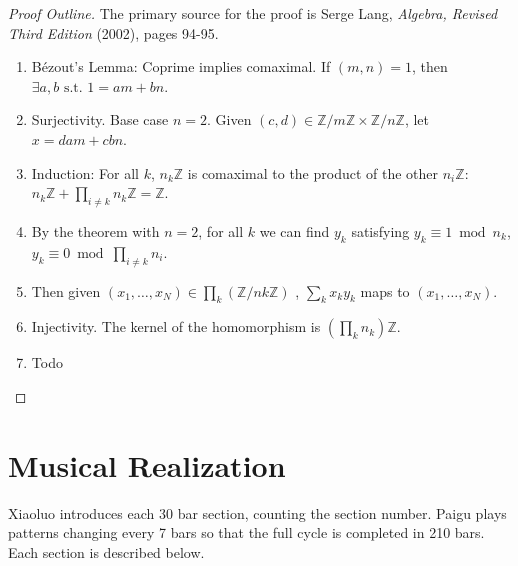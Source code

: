 \documentclass[12pt]{article}
\begin{document}
\begin{proof}[Proof Outline]
  The primary source for the proof is Serge Lang, \textit{Algebra,
    Revised Third Edition} (2002), pages 94-95.
  \begin{enumerate}
    \item Bézout’s Lemma: Coprime implies comaximal. If $(m,n) = 1$,
      then $\exists a,b \text{ s.t. } 1 = am + bn$.
    \item Surjectivity. Base case $n=2$. Given $(c,d) \in \mathbb{Z} /
      m\mathbb{Z} \times \mathbb{Z} / n\mathbb{Z}$, let $x =dam + cbn$.
    \item Induction: For all $k$, $n_k\mathbb{Z}$ is comaximal to the
      product of the other $n_i\mathbb{Z}$: $n_k\mathbb{Z} + \prod_{i
      \ne k}n_k\mathbb{Z} = \mathbb{Z}$.
    \item By the theorem with $n=2$, for all $k$ we can find $y_k$
      satisfying $y_k \equiv 1 \bmod n_k$, $y_k \equiv 0 \bmod \prod_{i\ne
        k}n_i$.
    \item Then given $(x_1,\ldots,x_N) \in \prod_k (\mathbb{Z} /
      nk\mathbb{Z})$ , $\sum_k x_ky_k$ maps to $(x_1,\ldots,x_N)$.
    \item Injectivity. The kernel of the homomorphism is
      $(\prod_k n_k)\mathbb{Z}$.
    \item Todo
  \end{enumerate}
\end{proof}

\section{Musical Realization}

Xiaoluo introduces each 30 bar section, counting the section
number. Paigu plays patterns changing every 7 bars so that the full
cycle is completed in 210 bars. Each section is described below.
\end{document}
